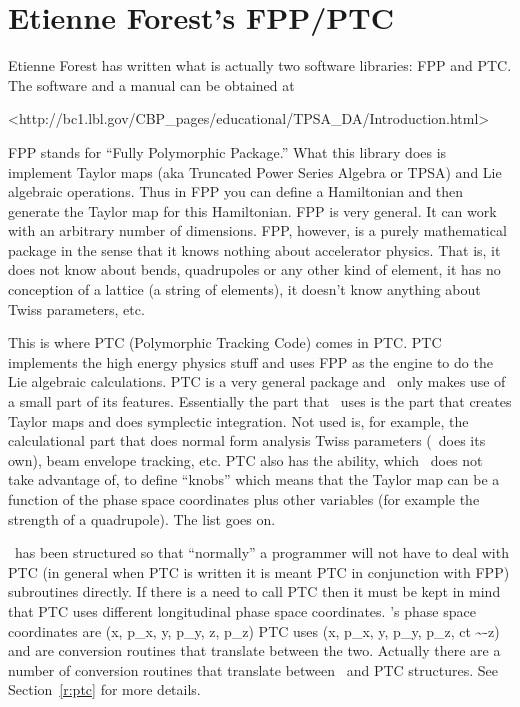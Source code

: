\chapter{Etienne Forest's FPP/PTC}
\label{c:etienne}


Etienne Forest\cite{b:etienne} has written what is actually two
software libraries: FPP and PTC. The software and a manual can be
obtained at
\begin{example} 
    <http://bc1.lbl.gov/CBP_pages/educational/TPSA_DA/Introduction.html>
\end{example}

FPP stands for ``Fully Polymorphic Package.'' What this library does
is implement Taylor maps (aka Truncated Power Series Algebra or TPSA)
and Lie algebraic operations. Thus in FPP you can define a Hamiltonian
and then generate the Taylor map for this Hamiltonian. FPP is very
general. It can work with an arbitrary number of dimensions.  FPP,
however, is a purely mathematical package in the sense that it knows
nothing about accelerator physics. That is, it does not know about
bends, quadrupoles or any other kind of element, it has no conception
of a lattice (a string of elements), it doesn't know anything about
Twiss parameters, etc.

This is where PTC (Polymorphic Tracking Code) comes in PTC. PTC
implements the high energy physics stuff and uses FPP as the engine to
do the Lie algebraic calculations.  PTC is a very general package and
\bmad\ only makes use of a small part of its features. Essentially
the part that \bmad\ uses is the part that creates Taylor maps and
does symplectic integration. Not used is, for example, the
calculational part that does normal form analysis Twiss parameters
(\bmad\ does its own), beam envelope tracking, etc. PTC also has the
ability, which \bmad\ does not take advantage of, to define ``knobs''
which means that the Taylor map can be a function of the phase space
coordinates plus other variables (for example the strength of a
quadrupole). The list goes on. 

\bmad\ has been structured so that ``normally'' a programmer will not have
to deal with PTC (in general when PTC is written it is meant PTC in
conjunction with FPP) subroutines directly. If there is a need to
call PTC then it must be kept in mind that PTC uses different
longitudinal phase space coordinates.
\bmad's phase space coordinates are
\Begineq
  (x, p_x, y, p_y, z, p_z)
\Endeq
PTC uses
\Begineq
  (x, p_x, y, p_y, p_z, ct \sim -z)
\Endeq
{} and  are conversion routines
that translate between the two. Actually there are a number of
conversion routines that translate between \bmad\ and PTC
structures. See Section~\ref{r:ptc} for more details.

